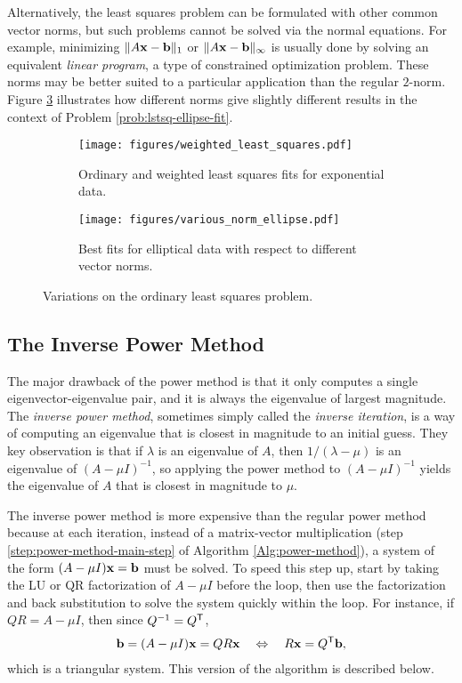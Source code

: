 Alternatively, the least squares problem can be formulated with other common vector norms, but such problems cannot be solved via the normal equations.
For example, minimizing $\|A\mathbf{x} - \mathbf{b}\|_1$ or $\|A\mathbf{x} - \mathbf{b}\|_\infty$ is usually done by solving an equivalent \emph{linear program}, a type of constrained optimization problem.
These norms may be better suited to a particular application than the regular $2$-norm.
Figure \ref{fig:lstsq-different-norms} illustrates how different norms give slightly different results in the context of Problem \ref{prob:lstsq-ellipse-fit}.

\begin{figure}[H] %
\captionsetup[subfigure]{justification=centering}
\centering
\begin{subfigure}{.49\textwidth}
    \centering
    \texttt{[image: figures/weighted\_least\_squares.pdf]}
    \caption{Ordinary and weighted least squares fits for exponential data.}
    \label{fig:lstsq-ols-vs-wls}
\end{subfigure}
%
\begin{subfigure}{.49\textwidth}
    \centering
    \texttt{[image: figures/various\_norm\_ellipse.pdf]}
    \caption{Best fits for elliptical data with respect to different vector norms.}
    \label{fig:lstsq-different-norms}
\end{subfigure}
\caption{Variations on the ordinary least squares problem.}
\end{figure}

\subsection*{The Inverse Power Method} %

The major drawback of the power method is that it only computes a single eigenvector-eigenvalue pair, and it is always the eigenvalue of largest magnitude.
The \emph{inverse power method}, sometimes simply called the \emph{inverse iteration}, is a way of computing an eigenvalue that is closest in magnitude to an initial guess.
They key observation is that if $\lambda$ is an eigenvalue of $A$, then $1/(\lambda - \mu)$ is an eigenvalue of $(A - \mu I)^{-1}$, so applying the power method to $(A - \mu I)^{-1}$ yields the eigenvalue of $A$ that is closest in magnitude to $\mu$.

The inverse power method is more expensive than the regular power method because at each iteration, instead of a matrix-vector multiplication (step \ref{step:power-method-main-step} of Algorithm \ref{Alg:power-method}), a system of the form $(A - \mu I)\mathbf{x} = \mathbf{b}$ must be solved.
To speed this step up, start by taking the LU or QR factorization of $A - \mu I$ before the loop, then use the factorization and back substitution to solve the system quickly within the loop.
For instance, if $QR = A - \mu I$, then since $Q^{-1} = Q^{\mathsf T}$,
\begin{align*}
    \mathbf{b}
    = (A-\mu I)\mathbf{x}
    = QR\mathbf{x}
    \quad\Leftrightarrow\quad
    R\mathbf{x} = Q^{\mathsf T}\mathbf{b},
\end{align*}
which is a triangular system.
This version of the algorithm is described below.

